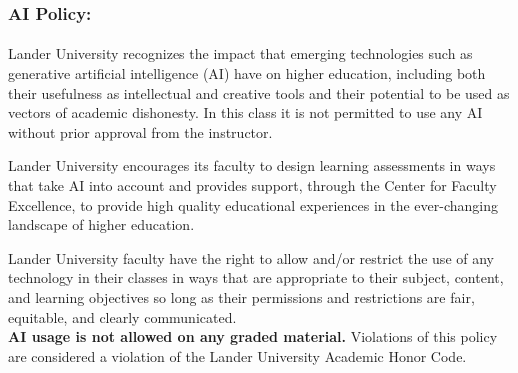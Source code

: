 \documentclass{article}
\begin{document}
    \begin{samepage}
      \subsubsection*{AI Policy:} \paragraph*{}
  Lander University recognizes the impact that emerging technologies such as generative artificial intelligence (AI) have on higher education, including both their usefulness as intellectual and creative tools and their potential to be used as vectors of academic dishonesty.
  In this class it is not permitted to use any AI without prior approval from the instructor.

  Lander University encourages its faculty to design learning assessments in ways that take AI into account and provides support, through the Center for Faculty Excellence, to provide high quality educational experiences in the ever-changing landscape of higher education.

  Lander University faculty have the right to allow and/or restrict the use of any technology in their classes in ways that are appropriate to their subject, content, and learning objectives so long as their permissions and restrictions are fair, equitable, and clearly communicated.\\

  \textbf{AI usage is not allowed on any graded material.}
  Violations of this policy are considered a violation of the Lander University Academic Honor Code.

    \end{samepage}
\end{document}
